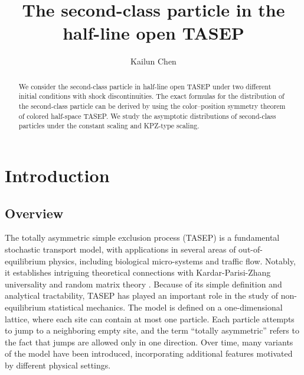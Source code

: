 \documentclass[12pt,a4paper]{amsart}
\theoremstyle{remark}
\numberwithin{equation}{section} \numberwithin{theorem}{section}
\begin{document}
\title{The second-class particle in the half-line open TASEP}

\author[Kailun Chen]{Kailun Chen}\address{Institute of Mathematics, Leipzig University, Augustusplatz 10, 04109 Leipzig, Germany.}

\begin{abstract}
We consider the second-class particle in half-line open TASEP under two different initial conditions with shock discontinuities. The exact formulas for the distribution of the second-class particle can be derived by using the color--position symmetry theorem of colored half-space TASEP. We study the asymptotic distributions of second-class particles under the constant scaling and KPZ-type scaling.
\end{abstract}

\maketitle

\section{Introduction}

\subsection{Overview}
The totally asymmetric simple exclusion process (TASEP) is a fundamental stochastic transport model, with applications in several areas of out-of-equilibrium physics, including biological micro-systems and traffic flow. 
Notably, it establishes intriguing theoretical connections with Kardar-Parisi-Zhang universality \cite{Cor12} and random matrix theory \cite{Fer10}. 
Because of its simple definition and analytical tractability, TASEP has played an important role in the study of non-equilibrium statistical mechanics. 
The model is defined on a one-dimensional lattice, where each site can contain at most one particle. 
Each particle attempts to jump to a neighboring empty site, and the term ``totally asymmetric'' refers to the fact that jumps are allowed only in one direction. 
Over time, many variants of the model have been introduced, incorporating additional features motivated by different physical settings.
\end{document}
